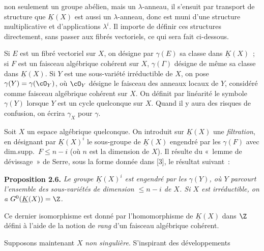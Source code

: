 non
seulement un groupe abélien, mais un $\lambda$-anneau, il s'ensuit par transport de structure que $\underline{K}(X)$ est aussi un $\lambda$-anneau, donc est muni d'une structure multiplicative et d'applications $\lambda^i$. Il importe de définir ces structures directement, sans passer aux fibrés vectoriels, ce qui sera fait ci-dessous.

Si $E$ est un fibré vectoriel sur $X$, on désigne par $\gamma(E)$ sa classe dans $\underline{K}(X)$~; si $F$ est un faisceau algébrique cohérent sur $X$, $\gamma(\Gamma)$ désigne de même sa classe dans $\underline{K}(X)$. Si $Y$ est une sous-variété irréductible de $X$, on pose $\gamma(Y)=\gamma(\cO_Y)$, où $\cO_Y$ désigne le faisceau des anneaux locaux de $Y$, considéré comme faisceau algébrique cohérent sur $X$. On définit par linéarité le symbole $\gamma(Y)$ lorsque $Y$ est un cycle quelconque sur $X$. Quand il y aura des risques de confusion, on écrira $\gamma_X$ pour $\gamma$.

Soit $X$ un espace algébrique quelconque. On introduit sur $\underline{K}(X)$ une \emph{filtration}, en désignant par $\underline{K}(X)^i$ le sous-groupe de $\underline{K}(X)$ engendré par les $\gamma(F)$ avec dim.supp.\ $F\leq n-i$ (où $n$ est la dimension de $X$). Il résulte du «~lemme de dévissage~» de Serre, sous la forme donnée dans [3], le résultat suivant~:

\textbf{Proposition 2.6.} \emph{Le groupe $\underline{K}(X)^i$ est engendré par les $\gamma(Y)$, où $Y$ parcourt l'ensemble des sous-variétés de dimension $\leq n-i$ de $X$. Si $X$ est irréductible, on a $G^0(\underline{K}(X))=\Z$.}

Ce dernier isomorphisme est donné par l'homomorphisme de $\underline{K}(X)$ dans $\Z$ défini à l'aide de la notion de \emph{rang} d'un faisceau algébrique cohérent.

Supposons maintenant $X$ \emph{non singulière}. S'inspirant des développements 
